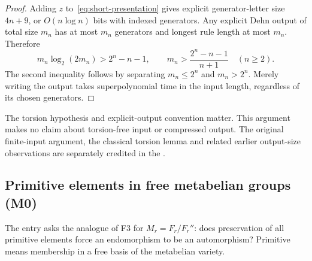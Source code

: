 \begin{proof}
Adding $z$ to~\eqref{eq:short-presentation} gives explicit
generator-letter size $4n+9$, or $O(n\log n)$ bits with indexed
generators. Any explicit Dehn output of total size $m_n$ has at most
$m_n$ generators and longest rule length at most $m_n$. Therefore
\[
 m_n\log_2(2m_n)>2^n-n-1,
 \qquad m_n>\frac{2^n-n-1}{n+1}\quad(n\ge2).
\]
The second inequality follows by separating $m_n\le2^n$ and
$m_n>2^n$. Merely writing the output takes superpolynomial time
in the input length, regardless of its chosen generators.
\end{proof}

The torsion hypothesis and explicit-output convention matter. This
argument makes no claim about torsion-free input or compressed output.
The original finite-input argument, the classical torsion lemma and
related earlier output-size observations are separately credited in
the .

\subsection{Primitive elements in free metabelian groups (M0)}\label{sec:m0}
The entry asks the analogue of F3 for $M_r=F_r/F_r''$: does preservation
of all primitive elements force an endomorphism to be an automorphism?
Primitive means membership in a free basis of the metabelian variety.

